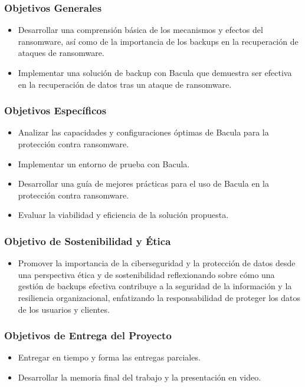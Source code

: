 \subsubsection{Objetivos Generales}

\begin{itemize}
  \item Desarrollar una comprensión básica de los mecanismos y efectos del ransomware, así como de la importancia de los backups en la recuperación de ataques de ransomware.
  \item Implementar una solución de backup con Bacula que demuestra ser efectiva en la recuperación de datos tras un ataque de ransomware.
\end{itemize}

\subsubsection{Objetivos Específicos}
\begin{itemize}
  \item Analizar las capacidades y configuraciones óptimas de Bacula para la protección contra ransomware.
  \item Implementar un entorno de prueba con Bacula.
  \item Desarrollar una guía de mejores prácticas para el uso de Bacula en la protección contra ransomware.
  \item Evaluar la viabilidad y eficiencia de la solución propuesta.
\end{itemize}

\subsubsection{Objetivo de Sostenibilidad y Ética}
\begin{itemize}
  \item 
Promover la importancia de la ciberseguridad y la protección de datos desde una perspectiva ética y de sostenibilidad reflexionando sobre cómo una gestión de backups efectiva contribuye a la seguridad de la información y la resiliencia organizacional, enfatizando la responsabilidad de proteger los datos de los usuarios y clientes.

\end{itemize}

\subsubsection{Objetivos de Entrega del Proyecto}
\begin{itemize}
  \item Entregar en tiempo y forma las entregas parciales.
  \item Desarrollar la memoria final del trabajo y la presentación en video.
\end{itemize}

